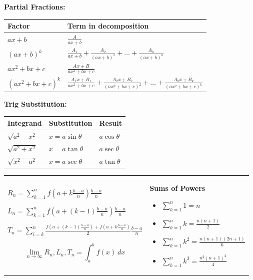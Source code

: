 \documentclass{article}
\newenvironment{bx}[1][]{
\begin{tcolorbox}[colback=white!97!black, title=#1, arc=0in, halign=flush left, left=1mm, right=1mm,]
}{
\end{tcolorbox}
}
\begin{document}
\begin{multicols}{2}
\begin{bx}[Integration]
\textbf{Partial Fractions:}
\begin{center}
\def\arraystretch{1.5}
\begin{tabular}{@{}ll@{}}
\toprule[0.4mm]
      Factor & Term in decomposition\\
      \hline
      $ax+b$          & $\frac{A}{ax+b}$ \\
      $(ax+b)^k$      & $\frac{A_1}{ax+b}+\frac{A_2}{(ax+b)^2}+\dots+\frac{A_k}{(ax+b)^k}$ \\
      $ax^2+bx+c$     & $\frac{Ax+B}{ax^2+bx+c}$\\
      $(ax^2+bx+c)^k$ & $\frac{A_1x+B_1}{ax^2+bx+c}+\frac{A_2x+B_2}{(ax^2+bx+c)^2}+\dots+\frac{A_kx+B_k}{(ax^2+bx+c)^k}$ \\
\bottomrule[0.4mm]
\end{tabular}
\end{center}

\vspace{0.5em}

\textbf{Trig Substitution:}\\
\begin{center}
\def\arraystretch{1.5}
\begin{tabular}{@{}lll@{}}
    \toprule[0.4mm]
    Integrand & Substitution & Result \\
    \hline
    $\sqrt{a^2-x^2}$ & $x=a\sin\theta$ & $a\cos\theta$ \\
    $\sqrt{a^2+x^2}$ & $x=a\tan\theta$ & $a\sec\theta$ \\
    $\sqrt{x^2-a^2}$ & $x=a\sec\theta$ & $a\tan\theta$ \\
    \bottomrule[0.4mm]
\end{tabular}
\end{center}
\end{bx}

\begin{bx}[Riemann Sums]
\begin{tabular}{p{155pt} | p{100pt}}
    $ R_n=\sum_{k=1}^{n}f\left(a+k\frac{b-a}{n}\right)\frac{b-a}{n}$ 

$ L_n=\sum_{k=1}^{n}f\left(a+(k-1)\frac{b-a}{n}\right)\frac{b-a}{n}$ 

$ T_n=\sum_{i=k}^{n}\frac{f\left(a+(k-1)\frac{b-a}{n}\right)+f\left(a+k\frac{b-a}{n}\right)}{2}\frac{b-a}{n}$

$$\lim_{n\to\infty}R_n,L_n,T_n=\int_a^bf(x)\ dx$$

& 
\textbf{Sums of Powers}

\begin{itemize}[leftmargin=0.75em]
    \item $\sum_{k=1}^n 1 = n $
    \item $\sum_{k=1}^n k = \frac{n(n+1)}{2}$
    \item $\sum_{k=1}^n k^2 = \frac{n(n+1)(2n+1)}{6}$
    \item $\sum_{k=1}^n k^3 = \frac{n^2(n+1)^2}{4}$
\end{itemize}
\end{tabular}


\end{bx}
\end{multicols}
\end{document}
